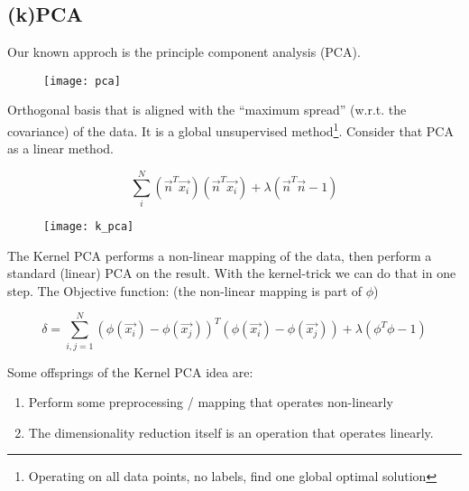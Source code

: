 
\subsection*{(k)PCA}

Our known approch is the principle component analysis (PCA).

\begin{figure}[H]
	\centering
	\texttt{[image: pca]}
\end{figure}

Orthogonal basis that is aligned with the ``maximum spread'' (w.r.t. the covariance) of the data. It is a global unsupervised method\footnote{Operating on all data points, no labels, find one global optimal solution}. Consider that PCA as a linear method.

\begin{equation*}
    \sum_{i}^{N} (\vec{n}^T \vec{x_i}) (\vec{n}^T \vec{x_i}) + \lambda (\vec{n}^T \vec{n} - 1)
\end{equation*}

\begin{figure}[H]
	\centering
	\texttt{[image: k\_pca]}
\end{figure}

The Kernel PCA performs a non-linear mapping of the data, then perform a standard (linear) PCA on the result. With the kernel-trick we can do that in one step. The Objective function: (the non-linear mapping is part of $\phi$)

\begin{equation*}
    \delta = \sum_{i,j=1}^{N} (\phi(\vec{x_i}) - \phi(\vec{x_j}))^T (\phi(\vec{x_i}) - \phi(\vec{x_j})) + \lambda (\phi^T\phi-1)
\end{equation*}

Some offsprings of the Kernel PCA idea are:
\begin{enumerate}
    \item Perform some preprocessing / mapping that operates non-linearly
    \item The dimensionality reduction itself is an operation that operates linearly.
\end{enumerate}
